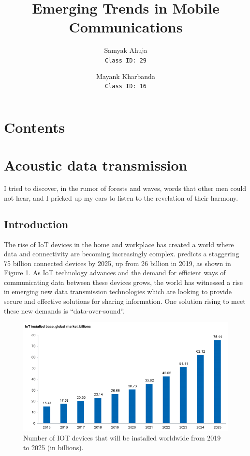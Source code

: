 \documentclass[notitlepage]{article}
\title{Emerging Trends in Mobile Communications}
\author{
    Samyak Ahuja \\
    \texttt{Class ID: 29}
    \and
    Mayank Kharbanda \\
    \texttt{Class ID: 16}
}
\makeatletter
\newcommand*{\toccontents}{\@starttoc{toc}}
\makeatother
\begin{document}
\vspace{0.5in}
\maketitle

\vspace{1in}
\section*{Contents}
\toccontents
\newpage


\section{Acoustic data transmission}
\epigraph{ I tried to discover, in the rumor of forests and waves, words
that other men could not hear, and I pricked up my ears to listen to the
revelation of their harmony.}{\textcite{november05}}

\subsection{Introduction}
The rise of IoT devices in the home and workplace has created a world where
data and connectivity are becoming increasingly complex. \textcite{ihs16}
predicts a staggering 75 billion connected devices by 2025, up from 26 billion
in 2019, as shown in Figure \ref{fig:ihs_iot}.  As IoT technology advances and the
demand for efficient ways of communicating data between these devices grows,
the world has witnessed a rise in emerging new data transmission technologies
which are looking to provide secure and effective solutions for sharing
information. One solution rising to meet these new demands is “data-over-sound”.

\begin{figure}[!h]
  \includegraphics[width=\linewidth]{res/iot_market_trend.png}
    \caption{Number of IOT devices that will be installed worldwide from 2019
    to 2025 (in billions).}
  \label{fig:ihs_iot}
\end{figure}
\end{document}

